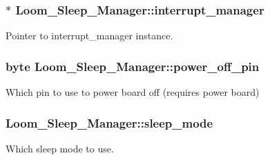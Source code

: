 \subsubsection[{\texorpdfstring{interrupt\+\_\+manager}{interrupt_manager}}]{$\ast$ Loom\+\_\+\+Sleep\+\_\+\+Manager\+::interrupt\+\_\+manager\hspace{0.3cm}{\ttfamily [protected]}}\hypertarget{class_loom___sleep___manager_a41c366974539c348f16c6b6e7f6ddae1}{}\label{class_loom___sleep___manager_a41c366974539c348f16c6b6e7f6ddae1}


Pointer to interrupt\+\_\+manager instance. 

\subsubsection[{\texorpdfstring{power\+\_\+off\+\_\+pin}{power_off_pin}}]{\setlength{\rightskip}{0pt plus 5cm}byte Loom\+\_\+\+Sleep\+\_\+\+Manager\+::power\+\_\+off\+\_\+pin\hspace{0.3cm}{\ttfamily [protected]}}\hypertarget{class_loom___sleep___manager_a46e360dc9b81c2a76e5f7f8d485dbae2}{}\label{class_loom___sleep___manager_a46e360dc9b81c2a76e5f7f8d485dbae2}


Which pin to use to power board off (requires power board) 

\subsubsection[{\texorpdfstring{sleep\+\_\+mode}{sleep_mode}}]{ Loom\+\_\+\+Sleep\+\_\+\+Manager\+::sleep\+\_\+mode\hspace{0.3cm}{\ttfamily [protected]}}\hypertarget{class_loom___sleep___manager_a3fdbc0a285480a155459ddc675a2482c}{}\label{class_loom___sleep___manager_a3fdbc0a285480a155459ddc675a2482c}


Which sleep mode to use. 

